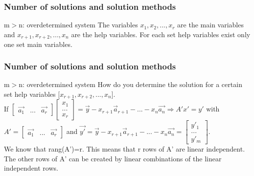\begin{frame}
	\frametitle{Number of solutions and solution methods}
	\begin{block}{m$>$n: overdetermined system}
		\vspace{4mm}
		The variables $x_1,x_2,...,x_r$ are the main variables and $x_{r+1},x_{r+2},...,x_n$ are the help variables. For each set help variables exist only one set main variables.\vspace{4mm}
	\end{block}
\end{frame}

\begin{frame}
	\frametitle{Number of solutions and solution methods}
	\begin{block}{m$>$n: overdetermined system}
		How do you determine the solution for a certain set help variables [$x_{r+1},x_{r+2},...,x_n$].\\
		If $\begin{bmatrix} \overrightarrow{a_1} & ... & \overrightarrow{a_r} \end{bmatrix} \begin{bmatrix}
		x_1\\...\\x_r \end{bmatrix}=\overrightarrow{y}-x_{r+1}\overrightarrow{a}_{r+1}-...-x_n\overrightarrow{a_n}
		\Rightarrow A'x'=y'$ with $A'=\begin{bmatrix} \overrightarrow{a_1} & ... & \overrightarrow{a_r} \end{bmatrix}$ and $\overrightarrow{y'}=\overrightarrow{y}-x_{r+1}\overrightarrow{a}_{r+1}-...-x_n\overrightarrow{a_n}=\begin{bmatrix}
		y'_1\\...\\y'_m
		\end{bmatrix}$.\\
		We know that rang(A')=r. This means that r rows of A' are linear independent. The other rows of A' can be created by linear combinations of the linear independent rows. 
	\end{block}
\end{frame}

